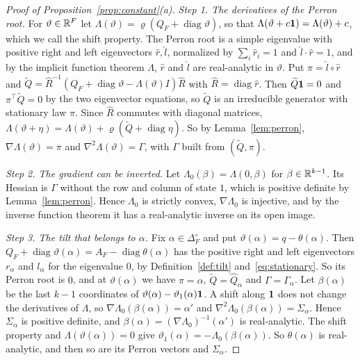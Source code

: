 \begin{proof}[Proof of Proposition~\ref{prop:constant}(a)]
\emph{Step 1. The derivatives of the Perron root.} For $\vartheta\in\mathbb{R}^F$ let
$\Lambda(\vartheta)=\varrho(Q_F+\operatorname{diag}\vartheta)$, so that
$\Lambda(\vartheta+c\mathbf{1})=\Lambda(\vartheta)+c$, which we call the shift property. The Perron root is
a simple eigenvalue with positive right and left eigenvectors
$\hat r,\hat l$, normalized by $\sum_i\hat r_i=1$ and $\hat l\cdot\hat r=1$,
and by the implicit function theorem $\Lambda$, $\hat r$ and $\hat l$ are
real-analytic in $\vartheta$. Put $\pi=\hat l\circ\hat r$ and
$\widetilde Q=\hat R^{-1}(Q_F+\operatorname{diag}\vartheta-\Lambda(\vartheta)I)\hat R$
with $\hat R=\operatorname{diag}\hat r$. Then $\widetilde Q\mathbf{1}=0$ and $\pi^\top \widetilde Q=0$
by the two eigenvector equations, so $\widetilde Q$ is an irreducible generator with
stationary law $\pi$. Since $\hat R$ commutes with diagonal matrices,
$\Lambda(\vartheta+\eta)=\Lambda(\vartheta)+\varrho(\widetilde Q+\operatorname{diag}\eta)$.
So by Lemma~\ref{lem:perron}, $\nabla\Lambda(\vartheta)=\pi$ and
$\nabla^2\Lambda(\vartheta)=\Gamma$, with $\Gamma$ built from $(\widetilde Q,\pi)$.

\emph{Step 2. The gradient can be inverted.} Let
$\Lambda_0(\beta)=\Lambda(0,\beta)$ for $\beta\in\mathbb{R}^{k-1}$. Its Hessian is
$\Gamma$ without the row and column of state $1$, which is positive definite
by Lemma~\ref{lem:perron}. Hence $\Lambda_0$ is strictly convex,
$\nabla\Lambda_0$ is injective, and by the inverse function theorem it has a
real-analytic inverse on its open image.

\emph{Step 3. The tilt that belongs to $\alpha$.} Fix
$\alpha\in\Delta_F^\circ$ and put $\vartheta(\alpha)=q-\theta(\alpha)$. Then
$Q_F+\operatorname{diag}\vartheta(\alpha)=A_F-\operatorname{diag}\theta(\alpha)$
has the positive right and left eigenvectors $r_\alpha$ and $l_\alpha$ for
the eigenvalue $0$, by Definition~\ref{def:tilt} and~\eqref{eq:stationary}.
So its Perron root is $0$, and at $\vartheta(\alpha)$ we have $\pi=\alpha$,
$\widetilde Q=\widehat Q_\alpha$ and $\Gamma=\Gamma_\alpha$. Let $\beta(\alpha)$ be the
last $k-1$ coordinates of $\vartheta(\alpha)-\vartheta_1(\alpha)\mathbf{1}$. A
shift along $\mathbf{1}$ does not change the derivatives of $\Lambda$, so
$\nabla\Lambda_0(\beta(\alpha))=\alpha'$ and
$\nabla^2\Lambda_0(\beta(\alpha))=\Sigma_\alpha$. Hence $\Sigma_\alpha$ is
positive definite, and $\beta(\alpha)=(\nabla\Lambda_0)^{-1}(\alpha')$ is
real-analytic. The shift property and $\Lambda(\vartheta(\alpha))=0$ give
$\vartheta_1(\alpha)=-\Lambda_0(\beta(\alpha))$. So $\theta(\alpha)$ is
real-analytic, and then so are its Perron vectors and $\Sigma_\alpha$.


\end{proof}
